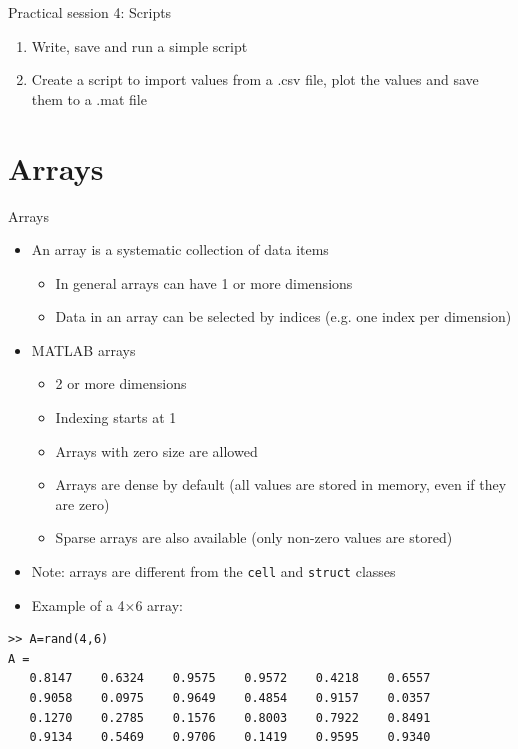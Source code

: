 \documentclass{beamer}
\begin{document}
\begin{frame}{Practical session 4: Scripts}
	\begin{enumerate}
		\item Write, save and run a simple script
		\item Create a script to import values from a .csv file, plot the values and save them to a .mat file
	\end{enumerate}
\end{frame}

\section{Arrays}
\begin{frame}[fragile]{Arrays}
	\begin{itemize}
		\item An array is a systematic collection of data items
		\begin{itemize}
			\item In general arrays can have 1 or more dimensions
			\item Data in an array can be selected by indices (e.g. one index per dimension)
		\end{itemize}
		\item MATLAB arrays
		\begin{itemize}
			\item 2 or more dimensions
			\item Indexing starts at 1
			\item Arrays with zero size are allowed
			\item Arrays are dense by default (all values are stored in memory, even if they are zero)
			\item Sparse arrays are also available (only non-zero values are stored)
		\end{itemize}
		\item Note: arrays are different from the \texttt{cell} and \texttt{struct} classes
		\item Example of a 4$\times$6 array:
	\end{itemize}
\begin{lstlisting}[style=Matlab-editor,basicstyle=\scriptsize]
>> A=rand(4,6)
A =
   0.8147    0.6324    0.9575    0.9572    0.4218    0.6557
   0.9058    0.0975    0.9649    0.4854    0.9157    0.0357
   0.1270    0.2785    0.1576    0.8003    0.7922    0.8491
   0.9134    0.5469    0.9706    0.1419    0.9595    0.9340
\end{lstlisting}
	
\end{frame}
\end{document}
